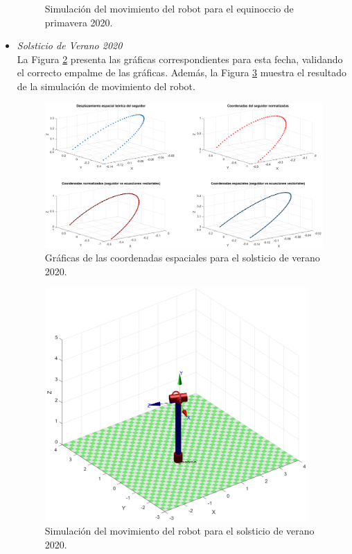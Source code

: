 \begin{itemize}
\begin{figure}[H]
    	\caption{Simulación del movimiento del robot para el equinoccio de primavera 2020.}
    	\label{fig:valmodelo7}
    \end{figure}
    \item \textit{Solsticio de Verano 2020}\\
    La Figura \ref{fig:valmodelo8} presenta las gráficas correspondientes para esta fecha, validando el correcto empalme de las gráficas. Además, la Figura \ref{fig:valmodelo9} muestra el resultado de la simulación de movimiento del robot.
    \begin{figure}[H]
    	\centering
    	\includegraphics[width=\columnwidth]{imagenes/valmodelo8}
    	\caption{Gráficas de las coordenadas espaciales para el solsticio de verano 2020.}
    	\label{fig:valmodelo8}
    \end{figure}
    \begin{figure}[H]
    	\centering
    	\includegraphics[width=10cm]{imagenes/valmodelo9}
    	\caption{Simulación del movimiento del robot para el solsticio de verano 2020.}
    	\label{fig:valmodelo9}
    \end{figure}
\end{itemize}

